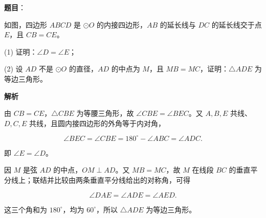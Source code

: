 \begin{answer}

\textbf{题目}：

如图，四边形 $ABCD$ 是 $\odot O$ 的内接四边形，$AB$ 的延长线与 $DC$ 的延长线交于点 $E$，且 $CB=CE$。
\nopagebreak[4]
\begin{center}\end{center}
\nopagebreak[4]
(1) 证明：$\angle D=\angle E$；

(2) 设 $AD$ 不是 $\odot O$ 的直径，$AD$ 的中点为 $M$，且 $MB=MC$，证明：$\triangle ADE$ 为等边三角形。

\textbf{解析}


由 $CB=CE$，$\triangle CBE$ 为等腰三角形，故 $\angle CBE=\angle BEC$。又 $A,B,E$ 共线、$D,C,E$ 共线，且圆内接四边形的外角等于内对角，

\nopagebreak[4]
\[
\angle BEC=\angle CBE=180^\circ-\angle ABC=\angle ADC.
\]

即 $\angle E=\angle D$。


因 $M$ 是弦 $AD$ 的中点，$OM\perp AD$。又 $MB=MC$，故 $M$ 在线段 $BC$ 的垂直平分线上；联结并比较由两条垂直平分线给出的对称角，可得

\nopagebreak[4]
\[
\angle DAE=\angle ADE=\angle AED.
\]

这三个角和为 $180^\circ$，均为 $60^\circ$，所以 $\triangle ADE$ 为等边三角形。



\end{answer}
